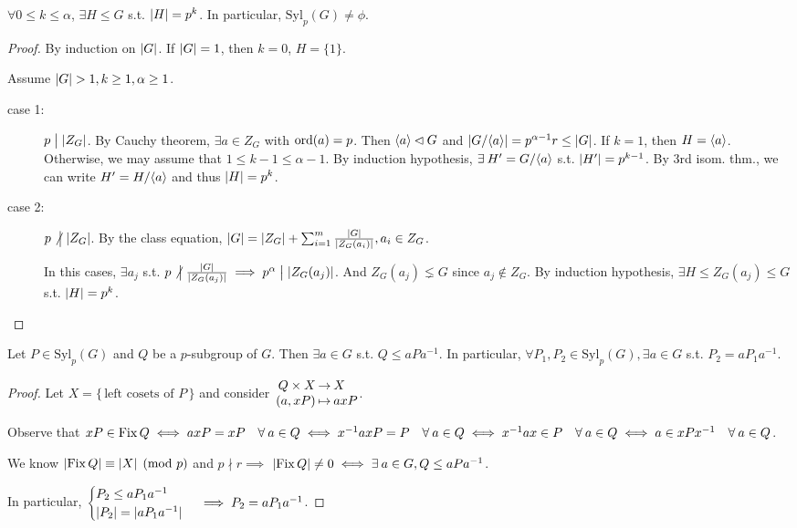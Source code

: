 \begin{theorem}
  $\forall 0 \le k \le \alpha$, $\exists H \le G$ s.t. $\abs{H} = p^k$.
  In particular, $\text{Syl}_p(G) \ne \phi$.

  \begin{proof}
    By induction on $\abs{G}$. If $\abs{G} = 1$, then $k = 0$, $H = \{1\}$.

    Assume $\abs{G} > 1, k \ge 1, \alpha \ge 1$.

    \begin{description}
      \item[case 1:] $p \Div \abs{Z_G}$. By Cauchy theorem,
        $\exists a \in Z_G$ with $\ord(a) = p$.
        Then $\gen{a} \lhd G$ and $\abs*{\quot{G}{\gen{a}}} = p^{\alpha-1} r
        \le \abs{G}$.
        If $k=1$, then $H = \gen{a}$.
        Otherwise, we may assume that $1\le k-1\le \alpha-1$. By induction
        hypothesis, $\exists H' = \quot{G}{\gen{a}}$ s.t. $\abs{H'} = p^{k-1}$.
        By 3rd isom. thm., we can write $H' = \quot{H}{\gen{a}}$ and thus
        $\abs{H} = p^k$.
      \item[case 2:] $p \nDiv \abs{Z_G}$. By the class equation,
        $\abs{G} = \abs{Z_G} + \sum_{i=1}^m \frac{\abs{G}}{\abs{Z_G(a_i)}},
        a_i \in Z_G$.

        In this cases, $\exists a_j$ s.t.
        $p \nDiv \frac{\abs{G}}{\abs{Z_G(a_j)}} \implies
        p^\alpha \Div \abs{Z_G(a_j)}$. And $Z_G(a_j) \lneq G$ since
        $a_j \notin Z_G$.
        By induction hypothesis, $\exists H \le Z_G(a_j) \le G$ s.t.
        $\abs{H} = p^k$. \qedhere
    \end{description}
  \end{proof}
\end{theorem}

\begin{theorem}
  Let $P \in \text{Syl}_p(G)$ and $Q$ be a $p$-subgroup of $G$. Then
  $\exists a \in G$ s.t. $Q \le aPa^{-1}$.
  In particular, $\forall P_1, P_2 \in \text{Syl}_p(G), \exists a \in G$
  s.t. $P_2 = aP_1a^{-1}$.
  \begin{proof}
    Let $X = \{\, \text{left cosets of $P$} \,\}$ and consider
    $\arraycolsep=1pt \begin{array}{rcl}
      Q \times X & \to & X \\
      (a, xP) & \mapsto & axP
    \end{array}$.

    Observe that $xP \in \Fix Q \iff axP = xP \quad \forall a \in Q \iff
    x^{-1}axP = P \quad \forall a \in Q \iff
    x^{-1}ax \in P \quad \forall a \in Q \iff
    a \in xPx^{-1} \quad \forall a \in Q$.

    We know $\abs{\Fix Q} \equiv \abs{X} \pmod p$ and $p \nmid r \implies$
    $\abs{\Fix Q} \ne 0 \iff \exists a \in G, Q \le aPa^{-1}$.

    In particular, $\begin{cases}
      P_2 \le aP_1a^{-1} \\
      \abs{P_2} = \abs{aP_1a^{-1}}
    \end{cases} \implies P_2 = aP_1a^{-1}$.
  \end{proof}
\end{theorem}

